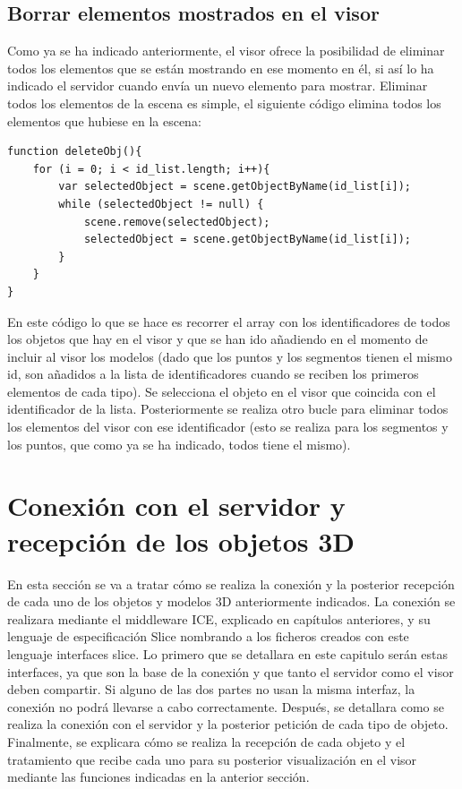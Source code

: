 \subsection{Borrar elementos mostrados en el visor}
Como ya se ha indicado anteriormente, el visor ofrece la posibilidad de eliminar todos los elementos que se están mostrando en ese momento en él, si así lo ha indicado el servidor cuando envía un nuevo elemento para mostrar. Eliminar todos los elementos de la escena es simple, el siguiente código elimina todos los elementos que hubiese en la escena:

\begin{lstlisting}[frame=single]
function deleteObj(){
	for (i = 0; i < id_list.length; i++){
		var selectedObject = scene.getObjectByName(id_list[i]);
		while (selectedObject != null) {
			scene.remove(selectedObject);
			selectedObject = scene.getObjectByName(id_list[i]);
		}
	}
}
\end{lstlisting}
En este código lo que se hace es recorrer el array con los identificadores de todos los objetos que hay en el visor y que se han ido añadiendo en el momento de incluir al visor los modelos (dado que los puntos y los segmentos tienen el mismo id, son añadidos a la lista de identificadores cuando se reciben los primeros elementos de cada tipo). Se selecciona el objeto en el visor que coincida con el identificador de la lista. Posteriormente se realiza otro bucle para eliminar todos los elementos del visor con ese identificador (esto se realiza para los segmentos y los puntos, que como ya se ha indicado, todos tiene el mismo).

\section{Conexión con el servidor y recepción de los objetos 3D}
En esta sección se va a tratar cómo se realiza la conexión y la posterior recepción de cada uno de los objetos y modelos 3D anteriormente indicados. La conexión se realizara mediante el middleware ICE, explicado en capítulos anteriores, y su lenguaje de especificación Slice nombrando a los ficheros creados con este lenguaje interfaces slice. Lo primero que se detallara en este capitulo serán estas interfaces, ya que son la base de la conexión y que tanto el servidor como el visor deben compartir. Si alguno de las dos partes no usan la misma interfaz, la conexión no podrá llevarse a cabo correctamente. Después, se detallara como se realiza la conexión con el servidor y la posterior petición de cada tipo de objeto. Finalmente, se explicara cómo se realiza la recepción de cada objeto y el tratamiento que recibe cada uno para su posterior visualización en el visor mediante las funciones indicadas en la anterior sección.


